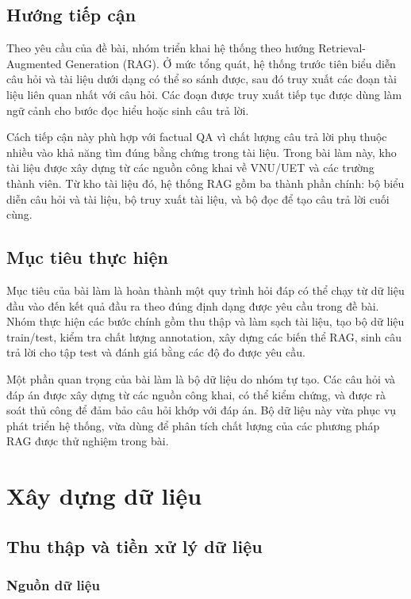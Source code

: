 \documentclass[12pt,a4paper]{report}
\begin{document}
\section{Hướng tiếp cận}

Theo yêu cầu của đề bài, nhóm triển khai hệ thống theo hướng Retrieval-Augmented Generation (RAG). Ở mức tổng quát, hệ thống trước tiên biểu diễn câu hỏi và tài liệu dưới dạng có thể so sánh được, sau đó truy xuất các đoạn tài liệu liên quan nhất với câu hỏi. Các đoạn được truy xuất tiếp tục được dùng làm ngữ cảnh cho bước đọc hiểu hoặc sinh câu trả lời.

Cách tiếp cận này phù hợp với factual QA vì chất lượng câu trả lời phụ thuộc nhiều vào khả năng tìm đúng bằng chứng trong tài liệu. Trong bài làm này, kho tài liệu được xây dựng từ các nguồn công khai về VNU/UET và các trường thành viên. Từ kho tài liệu đó, hệ thống RAG gồm ba thành phần chính: bộ biểu diễn câu hỏi và tài liệu, bộ truy xuất tài liệu, và bộ đọc để tạo câu trả lời cuối cùng.

\section{Mục tiêu thực hiện}

Mục tiêu của bài làm là hoàn thành một quy trình hỏi đáp có thể chạy từ dữ liệu đầu vào đến kết quả đầu ra theo đúng định dạng được yêu cầu trong đề bài. Nhóm thực hiện các bước chính gồm thu thập và làm sạch tài liệu, tạo bộ dữ liệu train/test, kiểm tra chất lượng annotation, xây dựng các biến thể RAG, sinh câu trả lời cho tập test và đánh giá bằng các độ đo được yêu cầu.

Một phần quan trọng của bài làm là bộ dữ liệu do nhóm tự tạo. Các câu hỏi và đáp án được xây dựng từ các nguồn công khai, có thể kiểm chứng, và được rà soát thủ công để đảm bảo câu hỏi khớp với đáp án. Bộ dữ liệu này vừa phục vụ phát triển hệ thống, vừa dùng để phân tích chất lượng của các phương pháp RAG được thử nghiệm trong bài.

\chapter{Xây dựng dữ liệu}

\section{Thu thập và tiền xử lý dữ liệu}

\subsection{Nguồn dữ liệu}
\end{document}
